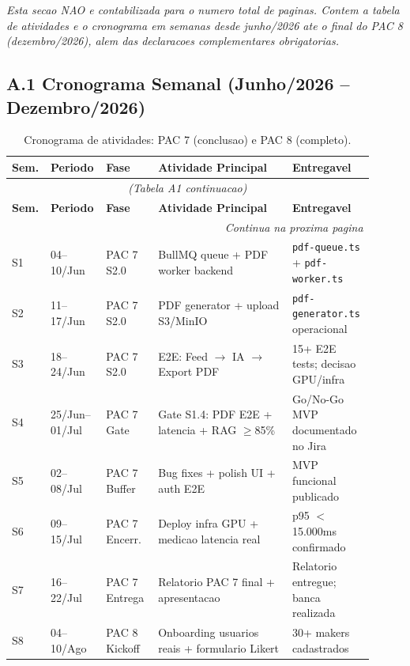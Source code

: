 \documentclass[portuguese]{sbcreviews-2025}%
\begin{document}
\noindent\textit{\small Esta secao NAO e contabilizada para o numero total de paginas. Contem a tabela de atividades e o cronograma em semanas desde junho/2026 ate o final do PAC 8 (dezembro/2026), alem das declaracoes complementares obrigatorias.}

\vspace{6pt}

\subsection*{A.1 Cronograma Semanal (Junho/2026 -- Dezembro/2026)}

\begin{longtable}{%
p{0.06\linewidth}
p{0.13\linewidth}
p{0.14\linewidth}
p{0.36\linewidth}
p{0.22\linewidth}
}
\caption{Cronograma de atividades: PAC 7 (conclusao) e PAC 8 (completo).}
\label{tab:cronograma} \\
\toprule
\textbf{Sem.} & \textbf{Periodo} & \textbf{Fase} & \textbf{Atividade Principal} & \textbf{Entregavel} \\
\midrule
\endfirsthead
\multicolumn{5}{c}{\textit{(Tabela A1 continuacao)}} \\
\toprule
\textbf{Sem.} & \textbf{Periodo} & \textbf{Fase} & \textbf{Atividade Principal} & \textbf{Entregavel} \\
\midrule
\endhead
\midrule
\multicolumn{5}{r}{\textit{Continua na proxima pagina}} \\
\endfoot
\bottomrule
\endlastfoot
S1 & 04--10/Jun & PAC 7 S2.0 & BullMQ queue + PDF worker backend & \texttt{pdf-queue.ts} + \texttt{pdf-worker.ts} \\
S2 & 11--17/Jun & PAC 7 S2.0 & PDF generator + upload S3/MinIO & \texttt{pdf-generator.ts} operacional \\
S3 & 18--24/Jun & PAC 7 S2.0 & E2E: Feed $\to$ IA $\to$ Export PDF & 15+ E2E tests; decisao GPU/infra \\
S4 & 25/Jun--01/Jul & PAC 7 Gate & Gate S1.4: PDF E2E + latencia + RAG $\geq$85\% & Go/No-Go MVP documentado no Jira \\
S5 & 02--08/Jul & PAC 7 Buffer & Bug fixes + polish UI + auth E2E & MVP funcional publicado \\
S6 & 09--15/Jul & PAC 7 Encerr. & Deploy infra GPU + medicao latencia real & p95 $<$ 15.000ms confirmado \\
S7 & 16--22/Jul & PAC 7 Entrega & Relatorio PAC 7 final + apresentacao & Relatorio entregue; banca realizada \\
\midrule
S8 & 04--10/Ago & PAC 8 Kickoff & Onboarding usuarios reais + formulario Likert & 30+ makers cadastrados \\

\end{longtable}
\end{document}
